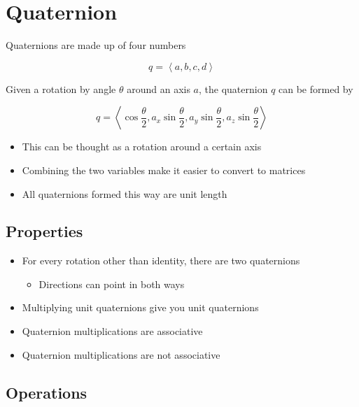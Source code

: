 \chapter{Quaternion}

Quaternions are made up of four numbers

\begin{equation}
  q = \left< a, b, c, d \right>
\end{equation}

Given a rotation by angle $ \theta $ around an axis $ a $, the quaternion $ q $
can be formed by

\begin{equation}
  q =
  \left<
    \cos\frac{\theta}{2},
    a_{x} \sin\frac{\theta}{2},
    a_{y} \sin\frac{\theta}{2},
    a_{z} \sin\frac{\theta}{2}
  \right>
\end{equation}

\begin{itemize}
  \item This can be thought as a rotation around a certain axis
  \item Combining the two variables make it easier to convert to matrices
  \item All quaternions formed this way are unit length
\end{itemize}

\section{Properties}

  \begin{itemize}
    \item For every rotation other than identity, there are two quaternions
    \begin{itemize}
      \item Directions can point in both ways
    \end{itemize}

    \item Multiplying unit quaternions give you unit quaternions
    \item Quaternion multiplications are associative
    \item Quaternion multiplications are not associative
  \end{itemize}

\section{Operations}

